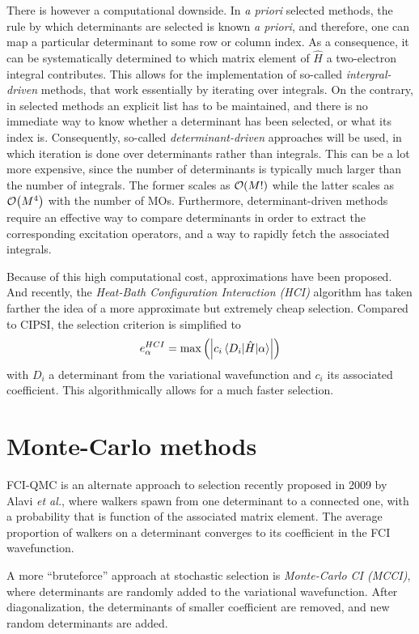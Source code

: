 \documentclass[./thesis.tex]{subfiles}
\begin{document}
There is however a computational downside. In \textit{a priori} selected methods, the rule by which determinants are selected is known \textit{a priori}, and therefore, one can map a particular determinant to some row or column index.\cite{Knowles_1984} As a consequence, it can be systematically determined to which matrix element of $\widehat{H}$ a two-electron integral contributes. This allows for the implementation of so-called \emph{intergral-driven} methods, that work essentially by iterating over integrals.
On the contrary, in selected methods an explicit list has to be maintained, and there is no immediate way to know whether a determinant has been selected, or what its index is. Consequently, so-called \emph{determinant-driven} approaches will be used, in which iteration is done over determinants rather than integrals. This can be a lot more expensive, since the number of determinants is typically much larger than the number of integrals. The former scales as $\order{M!}$ while the latter scales as $\order{M^4}$ with the number of MOs.
Furthermore, determinant-driven methods require an effective way to compare determinants in order to extract the corresponding excitation operators, and a way to rapidly fetch the associated integrals.

Because of this high computational cost, approximations have been proposed.\cite{Evangelisti_1983} And recently, the \emph{Heat-Bath Configuration Interaction (HCI)} algorithm has taken farther the idea of a more approximate but extremely cheap selection.\cite{Holmes_2016, Sharma_2017} Compared to CIPSI, the selection criterion is simplified to
\begin{equation}
e^{HCI}_\alpha = \max \qty( \qty| c_i \mel{D_i}{\hat{H}}{\alpha} | )
\end{equation}
with $D_i$ a determinant from the variational wavefunction and $c_i$ its associated coefficient. This algorithmically allows for a much faster selection.

\section{Monte-Carlo methods}
FCI-QMC is an alternate approach to selection recently proposed in 2009 by Alavi \textit{et al.},\cite{Booth_2009,Booth_2010,Cleland_2010} where walkers spawn from one determinant to a connected one, with a probability that is function of the associated matrix element. The average proportion of walkers on a determinant converges to its coefficient in the FCI wavefunction.

A more ``bruteforce'' approach at stochastic selection is \emph{Monte-Carlo CI (MCCI)},\cite{Greer_1995,Greer_1998} where determinants are randomly added to the variational wavefunction. After diagonalization, the determinants of smaller coefficient are removed, and new random determinants are added.
\end{document}
